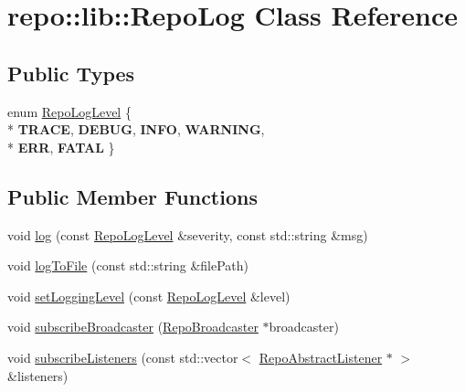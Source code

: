 \hypertarget{classrepo_1_1lib_1_1_repo_log}{}\section{repo\+:\+:lib\+:\+:Repo\+Log Class Reference}
\label{classrepo_1_1lib_1_1_repo_log}
\subsection*{Public Types}
\begin{DoxyCompactItemize}
\item 
enum \hyperlink{classrepo_1_1lib_1_1_repo_log_ad1d3f8148a47d718e4bf86a9d1edff81}{Repo\+Log\+Level} \{ \\*
{\bfseries T\+R\+A\+C\+E}, 
{\bfseries D\+E\+B\+U\+G}, 
{\bfseries I\+N\+F\+O}, 
{\bfseries W\+A\+R\+N\+I\+N\+G}, 
\\*
{\bfseries E\+R\+R}, 
{\bfseries F\+A\+T\+A\+L}
 \}
\end{DoxyCompactItemize}
\subsection*{Public Member Functions}
\begin{DoxyCompactItemize}
\item 
void \hyperlink{classrepo_1_1lib_1_1_repo_log_a27e4e0551856aa81044dda5ec5a073e3}{log} (const \hyperlink{classrepo_1_1lib_1_1_repo_log_ad1d3f8148a47d718e4bf86a9d1edff81}{Repo\+Log\+Level} \&severity, const std\+::string \&msg)
\item 
void \hyperlink{classrepo_1_1lib_1_1_repo_log_a93aa205cf29a757cfa714e1ca08eecb6}{log\+To\+File} (const std\+::string \&file\+Path)
\item 
void \hyperlink{classrepo_1_1lib_1_1_repo_log_a81089747b8922fdb2681f2c4263c98db}{set\+Logging\+Level} (const \hyperlink{classrepo_1_1lib_1_1_repo_log_ad1d3f8148a47d718e4bf86a9d1edff81}{Repo\+Log\+Level} \&level)
\item 
void \hyperlink{classrepo_1_1lib_1_1_repo_log_a7b938c8325a418ed59f743d0e7fa7c7d}{subscribe\+Broadcaster} (\hyperlink{classrepo_1_1lib_1_1_repo_broadcaster}{Repo\+Broadcaster} $\ast$broadcaster)
\item 
void \hyperlink{classrepo_1_1lib_1_1_repo_log_a82b7b3ff9930e5b35408785f2e0ed8a6}{subscribe\+Listeners} (const std\+::vector$<$ \hyperlink{classrepo_1_1lib_1_1_repo_abstract_listener}{Repo\+Abstract\+Listener} $\ast$ $>$ \&listeners)
\end{DoxyCompactItemize}
